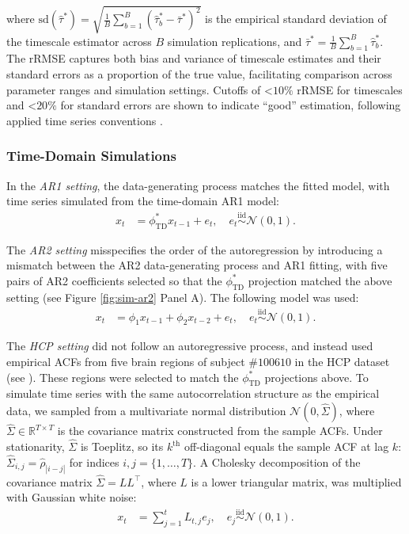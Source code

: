 \documentclass[9pt]{article}
\newcommand{\phitd}{\phi_{\scriptscriptstyle\text{TD}}}
\begin{document}
\noindent where $\text{sd}(\hat\tau^*) = \sqrt{\frac{1}{B} \sum_{b=1}^B (\hat\tau^*_b - \bar\tau^*)^2}$ is the empirical standard deviation of the timescale estimator across $B$ simulation replications, and $\bar\tau^* = \frac{1}{B} \sum_{b=1}^B \hat\tau^*_b$. The rRMSE captures both bias and variance of timescale estimates and their standard errors as a proportion of the true value, facilitating comparison across parameter ranges and simulation settings. Cutoffs of <$10\%$ rRMSE for timescales and <$20\%$ for standard errors are shown to indicate ``good'' estimation, following applied time series conventions \citep{jadon_comprehensive_2024}.

\subsubsection{Time-Domain Simulations}
In the \textit{AR1 setting}, the data-generating process matches the fitted model, with time series simulated from the time-domain AR1 model:
\begin{align}\label{eq:sim-td-ar1}
    x_t &= \phitd^* x_{t-1} + e_t, \quad e_t \overset{\text{iid}}{\sim} \mathcal{N}(0, 1).
\end{align}

The \textit{AR2 setting} misspecifies the order of the autoregression by introducing a mismatch between the AR2 data-generating process and AR1 fitting,  with five pairs of AR2 coefficients selected so that the $\phitd^*$ projection matched the above setting (see Figure \ref{fig:sim-ar2} Panel A). The following model was used:
\begin{align}\label{eq:sim-td-ar2}
    x_t &= \phi_1 x_{t-1} + \phi_2 x_{t-2} + e_t, \quad e_t \overset{\text{iid}}{\sim} \mathcal{N}(0, 1).
\end{align}

The \textit{HCP setting} did not follow an autoregressive process, and instead used empirical ACFs from five brain regions of subject $\#100610$ in the HCP dataset (see ). These regions were selected to match the $\phitd^*$ projections above. To simulate time series with the same autocorrelation structure as the empirical data, we sampled from a multivariate normal distribution $\mathcal{N}(0, \hat\Sigma)$, where $\hat\Sigma \in \mathbb{R}^{T\times T}$ is the covariance matrix constructed from the sample ACFs. Under stationarity, $\hat\Sigma$ is Toeplitz, so its $k^\text{th}$ off-diagonal equals the sample ACF at lag $k$: $\hat\Sigma_{i,j} = \hat\rho_{|i-j|}$ for indices $i,j=\{1, \dots, T\}$. A Cholesky decomposition of the covariance matrix $\hat\Sigma = LL^{\top}$, where $L$ is a lower triangular matrix, was multiplied with Gaussian white noise:
\begin{align}\label{eq:sim-td-hcp}
    x_t &= \sum_{j=1}^t L_{t,j} e_j, \quad e_j \overset{\text{iid}}{\sim} \mathcal{N}(0, 1).
\end{align}
\end{document}
